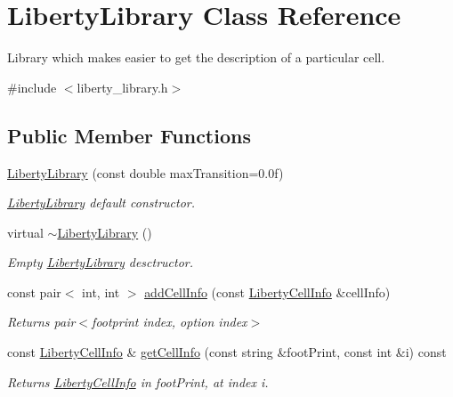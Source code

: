 \hypertarget{classLibertyLibrary}{\section{Liberty\-Library Class Reference}
\label{classLibertyLibrary}
}


Library which makes easier to get the description of a particular cell.  




{\ttfamily \#include $<$liberty\-\_\-library.\-h$>$}

\subsection*{Public Member Functions}
\begin{DoxyCompactItemize}
\item 
\hyperlink{classLibertyLibrary_a3b7513ef68e791245f60e16f6b4ee5d4}{Liberty\-Library} (const double max\-Transition=0.\-0f)
\begin{DoxyCompactList}\small\item\em \hyperlink{classLibertyLibrary}{Liberty\-Library} default constructor. \end{DoxyCompactList}\item 
virtual \hyperlink{classLibertyLibrary_ade99b2247c7d5eb9ef885bc4ec57091d}{$\sim$\-Liberty\-Library} ()
\begin{DoxyCompactList}\small\item\em Empty \hyperlink{classLibertyLibrary}{Liberty\-Library} desctructor. \end{DoxyCompactList}\item 
const pair$<$ int, int $>$ \hyperlink{classLibertyLibrary_a4d9ec0ea6af3949878d9b14042e761e6}{add\-Cell\-Info} (const \hyperlink{structLibertyCellInfo}{Liberty\-Cell\-Info} \&cell\-Info)
\begin{DoxyCompactList}\small\item\em Returns pair$<$footprint index, option index$>$ \end{DoxyCompactList}\item 
const \hyperlink{structLibertyCellInfo}{Liberty\-Cell\-Info} \& \hyperlink{classLibertyLibrary_a917ae50f0af17b1b68be754f1ae6dd07}{get\-Cell\-Info} (const string \&foot\-Print, const int \&i) const 
\begin{DoxyCompactList}\small\item\em Returns \hyperlink{structLibertyCellInfo}{Liberty\-Cell\-Info} in foot\-Print, at index i. \end{DoxyCompactList}\item 

\end{DoxyCompactItemize}
